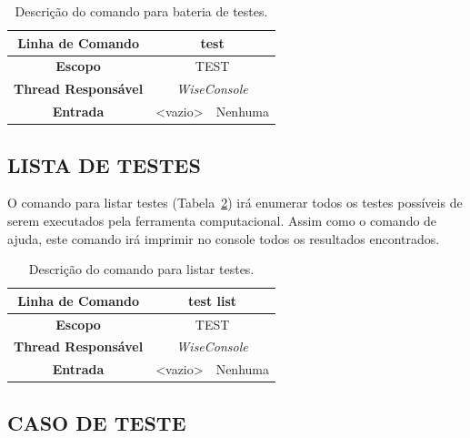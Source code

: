 \begin{center}
	\begin{table}[!htbp]
		\begin{tabularx}{\textwidth}{c|c|X}
			\toprule
			\textbf{Linha de Comando} & \multicolumn{2}{c}{test} \\
			\midrule
			\textbf{Escopo} & \multicolumn{2}{c}{TEST} \\
			\hline
			\textbf{Thread Responsável} & \multicolumn{2}{c}{\textit{WiseConsole}} \\
			\hline
			\textbf{Entrada} & <vazio> & Nenhuma \\
			\bottomrule
		\end{tabularx}
		\caption{Descrição do comando para bateria de testes.}
		\label{tab:test}
	\end{table}
\end{center}

\subsection{LISTA DE TESTES}\label{sec:test list}

O comando para listar testes (Tabela~\ref{tab:list_test}) irá enumerar todos os testes possíveis de serem executados pela ferramenta computacional. Assim como o comando de ajuda, este comando irá imprimir no console todos os resultados encontrados.

\begin{center}
	\begin{table}[!htbp]
		\begin{tabularx}{\textwidth}{c|c|X}
			\toprule
			\textbf{Linha de Comando} & \multicolumn{2}{c}{test list} \\
			\midrule
			\textbf{Escopo} & \multicolumn{2}{c}{TEST} \\
			\hline
			\textbf{Thread Responsável} & \multicolumn{2}{c}{\textit{WiseConsole}} \\
			\hline
			\textbf{Entrada} & <vazio> & Nenhuma \\
			\bottomrule
		\end{tabularx}
		\caption{Descrição do comando para listar testes.}
		\label{tab:list_test}
	\end{table}
\end{center}

\subsection{CASO DE TESTE}\label{sec:case list}

